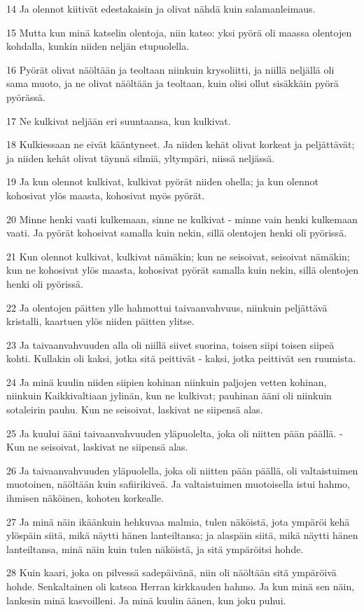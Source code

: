 \par 14 Ja olennot kiitivät edestakaisin ja olivat nähdä kuin salamanleimaus.
\par 15 Mutta kun minä katselin olentoja, niin katso: yksi pyörä oli maassa olentojen kohdalla, kunkin niiden neljän etupuolella.
\par 16 Pyörät olivat näöltään ja teoltaan niinkuin krysoliitti, ja niillä neljällä oli sama muoto, ja ne olivat näöltään ja teoltaan, kuin olisi ollut sisäkkäin pyörä pyörässä.
\par 17 Ne kulkivat neljään eri suuntaansa, kun kulkivat.
\par 18 Kulkiessaan ne eivät kääntyneet. Ja niiden kehät olivat korkeat ja peljättävät; ja niiden kehät olivat täynnä silmiä, yltympäri, niissä neljässä.
\par 19 Ja kun olennot kulkivat, kulkivat pyörät niiden ohella; ja kun olennot kohosivat ylös maasta, kohosivat myös pyörät.
\par 20 Minne henki vaati kulkemaan, sinne ne kulkivat - minne vain henki kulkemaan vaati. Ja pyörät kohosivat samalla kuin nekin, sillä olentojen henki oli pyörissä.
\par 21 Kun olennot kulkivat, kulkivat nämäkin; kun ne seisoivat, seisoivat nämäkin; kun ne kohosivat ylös maasta, kohosivat pyörät samalla kuin nekin, sillä olentojen henki oli pyörissä.
\par 22 Ja olentojen päitten ylle hahmottui taivaanvahvuus, niinkuin peljättävä kristalli, kaartuen ylös niiden päitten ylitse.
\par 23 Ja taivaanvahvuuden alla oli niillä siivet suorina, toisen siipi toisen siipeä kohti. Kullakin oli kaksi, jotka sitä peittivät - kaksi, jotka peittivät sen ruumista.
\par 24 Ja minä kuulin niiden siipien kohinan niinkuin paljojen vetten kohinan, niinkuin Kaikkivaltiaan jylinän, kun ne kulkivat; pauhinan ääni oli niinkuin sotaleirin pauhu. Kun ne seisoivat, laskivat ne siipensä alas.
\par 25 Ja kuului ääni taivaanvahvuuden yläpuolelta, joka oli niitten pään päällä. - Kun ne seisoivat, laskivat ne siipensä alas.
\par 26 Ja taivaanvahvuuden yläpuolella, joka oli niitten pään päällä, oli valtaistuimen muotoinen, näöltään kuin safiirikiveä. Ja valtaistuimen muotoisella istui hahmo, ihmisen näköinen, kohoten korkealle.
\par 27 Ja minä näin ikäänkuin hehkuvaa malmia, tulen näköistä, jota ympäröi kehä ylöspäin siitä, mikä näytti hänen lanteiltansa; ja alaspäin siitä, mikä näytti hänen lanteiltansa, minä näin kuin tulen näköistä, ja sitä ympäröitsi hohde.
\par 28 Kuin kaari, joka on pilvessä sadepäivänä, niin oli näöltään sitä ympäröivä hohde. Senkaltainen oli katsoa Herran kirkkauden hahmo. Ja kun minä sen näin, lankesin minä kasvoilleni. Ja minä kuulin äänen, kun joku puhui.

